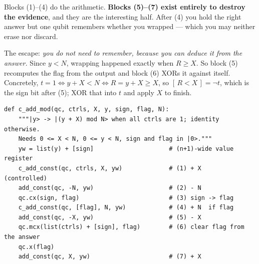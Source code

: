 \documentclass[11pt]{article}
\theoremstyle{plain}
\theoremstyle{remark}
\begin{document}
Blocks (1)--(4) do the arithmetic. \textbf{Blocks (5)--(7) exist entirely to destroy the evidence},
and they are the interesting half. After (4) you hold the right answer but one qubit remembers
whether you wrapped --- which you may neither erase nor discard.

The escape: \emph{you do not need to remember, because you can deduce it from the answer.} Since
$y<N$, wrapping happened exactly when $R\ge X$. So block (5) recomputes the flag from the output
and block (6) XORs it against itself. Concretely, $t=1\iff y+X<N\iff R=y+X\ge X$, so
$[\,R<X\,]=\neg t$, which is the sign bit after (5); XOR that into $t$ and apply $X$ to finish.

\begin{lstlisting}
def c_add_mod(qc, ctrls, X, y, sign, flag, N):
    """|y> -> |(y + X) mod N> when all ctrls are 1; identity otherwise.
    Needs 0 <= X < N, 0 <= y < N, sign and flag in |0>."""
    yw = list(y) + [sign]                     # (n+1)-wide value register
    c_add_const(qc, ctrls, X, yw)             # (1) + X          (controlled)
    add_const(qc, -N, yw)                     # (2) - N
    qc.cx(sign, flag)                         # (3) sign -> flag
    c_add_const(qc, [flag], N, yw)            # (4) + N  if flag
    add_const(qc, -X, yw)                     # (5) - X
    qc.mcx(list(ctrls) + [sign], flag)        # (6) clear flag from the answer
    qc.x(flag)
    add_const(qc, X, yw)                      # (7) + X
\end{lstlisting}
\end{document}
